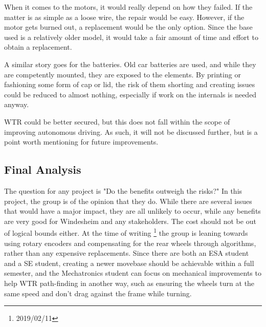When it comes to the motors, it would really depend on how they failed.
If the matter is as simple as a loose wire, the repair would be easy.
However, if the motor gets burned out, a replacement would be the only option.
Since the base used is a relatively older model, it would take a fair amount of time and effort to obtain a replacement.

A similar story goes for the batteries.
Old car batteries are used, and while they are competently mounted, they are exposed to the elements.
By printing or fashioning some form of cap or lid, the risk of them shorting and creating issues could be reduced to almost nothing, especially if work on the internals is needed anyway.

WTR could be better secured, but this does not fall within the scope of improving autonomous driving.
As such, it will not be discussed further, but is a point worth mentioning for future improvements.

\subsection{Final Analysis}
The question for any project is "Do the benefits outweigh the risks?"
In this project, the group is of the opinion that they do.
While there are several issues that would have a major impact, they are all unlikely to occur, while any benefits are very good for Windesheim and any stakeholders.
The cost should not be out of logical bounds either.
At the time of writing \footnote{2019/02/11} the group is leaning towards using rotary encoders and compensating for the rear wheels through algorithms, rather than any expensive replacements.
Since there are both an ESA student and a SE student, creating a newer movebase should be achievable within a full semester, and the Mechatronics student can focus on mechanical improvements to help WTR path-finding in another way, such as ensuring the wheels turn at the same speed and don't drag against the frame while turning.

\newpage